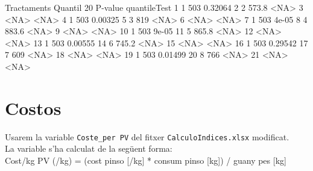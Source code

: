 \documentclass[11pt,a4paper]{article}\usepackage[]{graphicx}\usepackage[]{color}
\begin{document}
   Tractaments Quantil 20 P-value quantileTest
1            1        503              0.32064
2            2      573.8                 <NA>
3                    <NA>                 <NA>
4            1        503              0.00325
5            3        819                 <NA>
6                    <NA>                 <NA>
7            1        503                4e-05
8            4      883.6                 <NA>
9                    <NA>                 <NA>
10           1        503                9e-05
11           5      865.8                 <NA>
12                   <NA>                 <NA>
13           1        503              0.00555
14           6      745.2                 <NA>
15                   <NA>                 <NA>
16           1        503              0.29542
17           7        609                 <NA>
18                   <NA>                 <NA>
19           1        503              0.01499
20           8        766                 <NA>
21                   <NA>                 <NA>



\section{Costos}

Usarem la variable \texttt{Coste\_per PV} del fitxer \texttt{CalculoIndices.xlsx} modificat.\\

La variable s'ha calculat de la següent forma:\\

Cost/kg PV (\EUR{}/kg) = (cost pinso [\EUR{}/kg] * consum pinso [kg]) / guany pes [kg]
\end{document}
